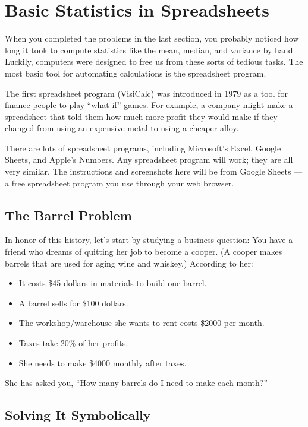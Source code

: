 \chapter{Basic Statistics in Spreadsheets}

When you completed the problems in the last section, you probably noticed
how long it took to compute statistics like the mean, median,
and variance by hand. Luckily, computers were designed to free us from these
sorts of tedious tasks. The most basic tool for automating
calculations is the spreadsheet program.

The first spreadsheet program (VisiCalc) was introduced in 1979 as a
tool for finance people to play ``what if'' games.  For example, a
company might make a spreadsheet that told them how much more profit
they would make if they changed from using an expensive metal to using
a cheaper alloy.

There are lots of spreadsheet programs, including Microsoft's Excel, Google Sheets, and
Apple's Numbers. Any spreadsheet program will work; they are all very
similar. The instructions and screenshots here will be from Google
Sheets --- a free spreadsheet program you use through your web browser.

\section{The Barrel Problem}
In honor of this history, let's start by studying a business question:
You have a friend who dreams of quitting her job to become a cooper. (A
cooper makes barrels that are used for aging wine and whiskey.)  According to her:
\begin{itemize}
\item It costs \$45 dollars in materials to build one barrel.
\item A barrel sells for \$100 dollars.
\item The workshop/warehouse she wants to rent costs \$2000 per month.
\item Taxes take 20\% of her profits.
\item She needs to make \$4000 monthly after taxes.
\end{itemize}

She has asked you, ``How many barrels do I need to make each month?''


\section{Solving It Symbolically}

